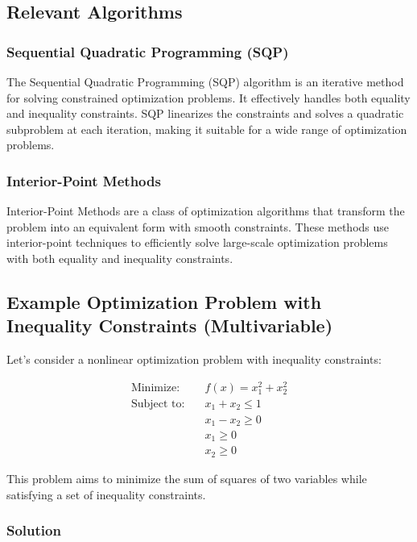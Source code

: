 \documentclass[a4paper]{article}
\begin{document}
\subsection{Relevant Algorithms}

\subsubsection{Sequential Quadratic Programming (SQP)}

The Sequential Quadratic Programming (SQP) algorithm is an iterative method for solving constrained optimization problems. It effectively handles both equality and inequality constraints. SQP linearizes the constraints and solves a quadratic subproblem at each iteration, making it suitable for a wide range of optimization problems.

\subsubsection{Interior-Point Methods}

Interior-Point Methods are a class of optimization algorithms that transform the problem into an equivalent form with smooth constraints. These methods use interior-point techniques to efficiently solve large-scale optimization problems with both equality and inequality constraints.

\subsection{Example Optimization Problem with Inequality Constraints (Multivariable)}

Let's consider a nonlinear optimization problem with inequality constraints:


\begin{align*}
\text{Minimize:} \quad & f(x) = x_1^2 + x_2^2 \\
\text{Subject to:} \quad & x_1 + x_2 \leq 1 \\
& x_1 - x_2 \geq 0 \\
& x_1 \geq 0 \\
& x_2 \geq 0
\end{align*}


This problem aims to minimize the sum of squares of two variables while satisfying a set of inequality constraints.

\subsubsection{Solution}
\end{document}
